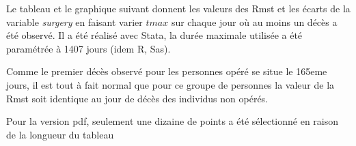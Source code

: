\documentclass[
  12pt,
  letterpaper,
  DIV=11,
  numbers=noendperiod,
  onepage,
  openany]{scrreprt}
\begin{document}
Le tableau et le graphique suivant donnent les valeurs des Rmst et les
écarts de la variable \emph{surgery} en faisant varier \(tmax\) sur
chaque jour où au moins un décès a été observé. Il a été réalisé avec
Stata, la durée maximale utilisée a été paramétrée à 1407 jours (idem R,
Sas).

Comme le premier décès observé pour les personnes opéré se situe le
165eme jours, il est tout à fait normal que pour ce groupe de personnes
la valeur de la Rmst soit identique au jour de décès des individus non
opérés.

\begin{tcolorbox}[enhanced jigsaw, arc=.35mm, bottomrule=.15mm, titlerule=0mm, colbacktitle=quarto-callout-note-color!10!white, left=2mm, opacitybacktitle=0.6, toprule=.15mm, title=\textcolor{quarto-callout-note-color}{\faInfo}\hspace{0.5em}{Note}, colframe=quarto-callout-note-color-frame, breakable, coltitle=black, opacityback=0, toptitle=1mm, bottomtitle=1mm, rightrule=.15mm, leftrule=.75mm, colback=white]

Pour la version pdf, seulement une dizaine de points a été sélectionné
en raison de la longueur du tableau

\end{tcolorbox}
\end{document}
